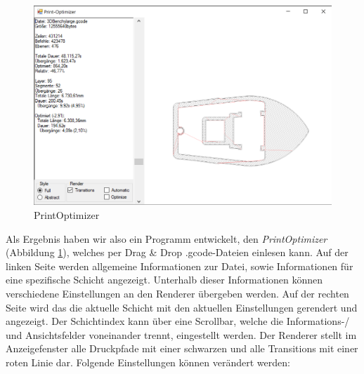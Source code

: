 \documentclass[12pt, a4paper]{article}
\begin{document}
\begin{figure}[h!]
	\includegraphics[width=\textwidth]{PrintOptimizer.PNG}
	\caption[PrintOptimizer\newline Screenshot erstellt mit dem Microsoft Snipping Tool]{PrintOptimizer}
    \label{img:PrintOptimizer}
\end{figure}
Als Ergebnis haben wir also ein Programm entwickelt, den \textit{PrintOptimizer} (Abbildung \ref{img:PrintOptimizer}), welches per Drag \& Drop .gcode-Dateien einlesen kann. Auf der linken Seite werden allgemeine Informationen zur Datei, sowie Informationen für eine spezifische Schicht angezeigt. Unterhalb dieser Informationen können verschiedene Einstellungen an den Renderer übergeben werden. Auf der rechten Seite wird das die aktuelle Schicht mit den aktuellen Einstellungen gerendert und angezeigt. Der Schichtindex kann über eine Scrollbar, welche die Informations-/ und Ansichtsfelder voneinander trennt, eingestellt werden.
Der Renderer stellt im Anzeigefenster alle Druckpfade mit einer schwarzen und alle Transitions mit einer roten Linie dar.
Folgende Einstellungen können verändert werden:
\end{document}

